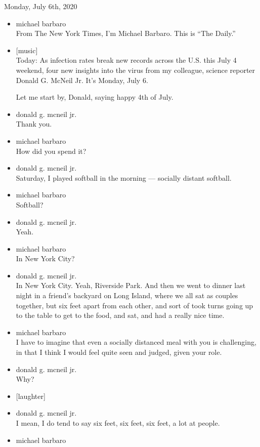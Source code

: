 Monday, July 6th, 2020

\begin{itemize}
\item
  michael barbaro\\
  From The New York Times, I'm Michael Barbaro. This is ``The Daily.''
\item
  {[}music{]}\\
  Today: As infection rates break new records across the U.S. this July
  4 weekend, four new insights into the virus from my colleague, science
  reporter Donald G. McNeil Jr. It's Monday, July 6.

  Let me start by, Donald, saying happy 4th of July.
\item
  donald g. mcneil jr.\\
  Thank you.
\item
  michael barbaro\\
  How did you spend it?
\item
  donald g. mcneil jr.\\
  Saturday, I played softball in the morning --- socially distant
  softball.
\item
  michael barbaro\\
  Softball?
\item
  donald g. mcneil jr.\\
  Yeah.
\item
  michael barbaro\\
  In New York City?
\item
  donald g. mcneil jr.\\
  In New York City. Yeah, Riverside Park. And then we went to dinner
  last night in a friend's backyard on Long Island, where we all sat as
  couples together, but six feet apart from each other, and sort of took
  turns going up to the table to get to the food, and sat, and had a
  really nice time.
\item
  michael barbaro\\
  I have to imagine that even a socially distanced meal with you is
  challenging, in that I think I would feel quite seen and judged, given
  your role.
\item
  donald g. mcneil jr.\\
  Why?
\item
  {[}laughter{]}
\item
  donald g. mcneil jr.\\
  I mean, I do tend to say six feet, six feet, six feet, a lot at
  people.
\item
  michael barbaro\\

\end{itemize}
